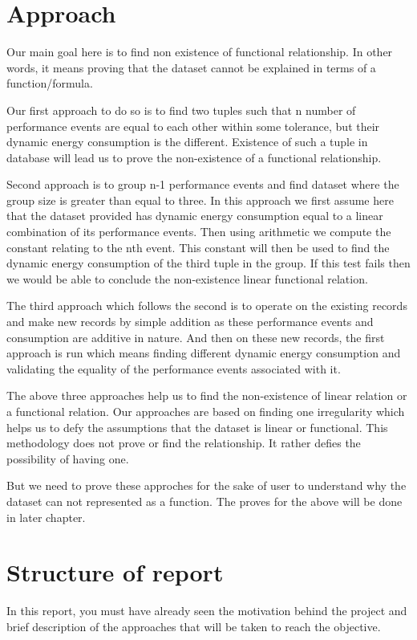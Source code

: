 \section{Approach}
Our main goal here is to find non existence of functional relationship. In other words, it means proving that the dataset cannot be explained in terms of a function/formula.

Our first approach to do so is to find two tuples such that n number of performance events are equal to each other within some tolerance, but their dynamic energy consumption is the different. Existence of such a tuple in database will lead us to prove the non-existence of a functional relationship.

Second approach is to group n-1 performance events and find dataset where the group size is greater than equal to three. In this approach we first assume here that the dataset provided has dynamic energy consumption equal to a linear combination of its performance events. Then using arithmetic we compute the constant relating to the nth event. This constant will then be used to find the dynamic energy consumption of the third tuple in the group. If this test fails then we would be able to conclude the non-existence linear functional relation.

The third approach which follows the second is to operate on the existing records and make new records by simple addition as these performance events and consumption are additive in nature. And then on these new records, the first approach is run which means finding different dynamic energy consumption and validating the equality of the performance events associated with it.

The above three approaches help us to find the non-existence of linear relation or a functional relation. Our approaches are based on finding one irregularity which helps us to defy the assumptions that the dataset is linear or functional. This methodology does not prove or find the relationship. It rather defies the possibility of having one.

But we need to prove these approches for the sake of user to understand why the dataset can not represented as a function. The proves for the above will be done in later chapter.

\section{Structure of report}
In this report, you must have already seen the motivation behind the project and brief description of the approaches that will be taken to reach the objective.

